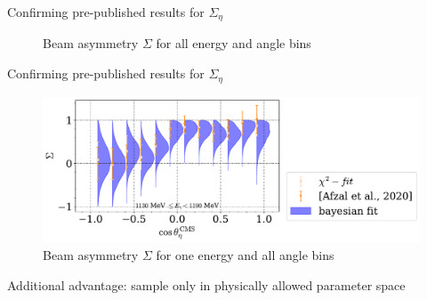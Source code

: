 \documentclass[11pt,aspectratio=169,dvipsnames]{beamer}
\begin{document}
	
	\begin{frame}{Confirming pre-published results for $\Sigma_\eta$}
		\begin{figure}
			\centering
			\caption*{Beam asymmetry $\Sigma$ for all energy and angle bins}
		\end{figure}
	\end{frame}
	\begin{frame}{Confirming pre-published results for $\Sigma_\eta$}
		\begin{figure}
			\centering
			\includegraphics[width=\linewidth]{sigma_eta_bin.pdf}
			\caption*{Beam asymmetry $\Sigma$ for one energy and all angle bins}
		\end{figure}
		Additional advantage: sample only in physically allowed parameter space
	\end{frame}
	
	
	
	
\end{document}
